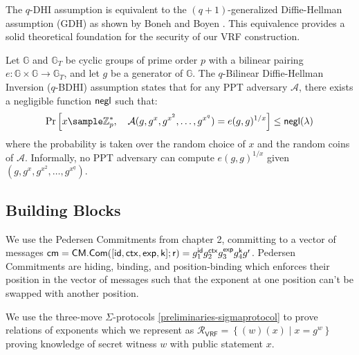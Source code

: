 \begin{remark}
The $q$-DHI assumption is equivalent to the $(q+1)$-generalized Diffie-Hellman assumption (GDH) as shown by Boneh and Boyen \cite{kanade_efficient_2004}. This equivalence provides a solid theoretical foundation for the security of our VRF construction.
\end{remark}



\begin{definition}
Let $\mathbb{G}$ and $\mathbb{G}_T$ be cyclic groups of prime order $p$ with a bilinear pairing $e: \mathbb{G} \times \mathbb{G} \to \mathbb{G}_T$, and let $g$ be a generator of $\mathbb{G}$. The $q$-Bilinear Diffie-Hellman Inversion ($q$-BDHI) assumption states that for any PPT adversary $\mathcal{A}$, there exists a negligible function $\mathsf{negl}$ such that:
\[
\Pr\left[ x \sample \mathbb{Z}_p^*, \quad \mathcal{A}(g, g^x, g^{x^2}, \ldots, g^{x^q}) = e(g, g)^{1/x} \right] \leq \negl(\lambda)
\]
where the probability is taken over the random choice of $x$ and the random coins of $\mathcal{A}$. Informally, no PPT adversary can compute $e(g, g)^{1/x}$ given $(g, g^x, g^{x^2}, \ldots, g^{x^q})$.
\end{definition}




\subsection{Building Blocks}
We use the Pedersen Commitments from chapter 2, committing to a vector of messages $\mathsf{cm} = \mathsf{CM.Com}([\mathsf{id}, \mathsf{ctx}, \mathsf{exp}, \mathsf{k}];\mathsf{r}) = g_1^{\mathsf{id}} g_2^{\mathsf{ctx}} g_3^{\mathsf{exp}} g_4^{\mathsf{k}} g^{\mathsf{r}}$. Pedersen Commitments are hiding, binding, and position-binding which enforces their position in the vector of messages such that the exponent at one position can't be swapped with another position. 

We use the three-move $\Sigma$-protocols \ref{preliminaries-sigmaprotocol} to prove relations of exponents which we represent as $\mathcal{R}_{\mathsf{VRF}} = \left\{(w)(x) \mid x = g^w \right\}$ proving knowledge of secret witness $w$ with public statement $x$. 


